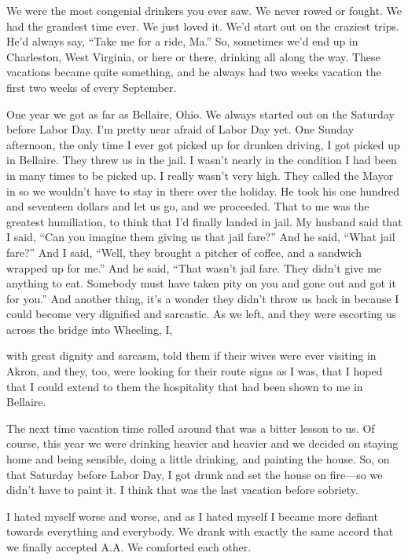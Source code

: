 \begin{biblechapter}
We were the most congenial drinkers you ever saw. We never rowed or fought. We had the grandest time ever. We just loved it. We’d start out on the craziest trips. He’d always say, “Take me for a ride, Ma.” So, sometimes we’d end up in Charleston, West Virginia, or here or there, drinking all along the way. These vacations became quite something, and he always had two weeks vacation the first two weeks of every September.

One year we got as far as Bellaire, Ohio. We always started out on the Saturday before Labor Day. I’m pretty near afraid of Labor Day yet. One Sunday afternoon, the only time I ever got picked up for drunken driving, I got picked up in Bellaire. They threw us in the jail. I wasn’t nearly in the condition I had been in many times to be picked up. I really wasn’t very high. They called the Mayor in so we wouldn’t have to stay in there over the holiday. He took his one hundred and seventeen dollars and let us go, and we proceeded. That to me was the greatest humiliation, to think that I’d finally landed in jail. My husband said that I said, “Can you imagine them giving us that jail fare?” And he said, “What jail fare?” And I said, “Well, they brought a pitcher of coffee, and a sandwich wrapped up for me.” And he said, “That wasn’t jail fare. They didn’t give me anything to eat. Somebody must have taken pity on you and gone out and got it for you.” And another thing, it’s a wonder they didn’t throw us back in because I could become very dignified and sarcastic. As we left, and they were escorting us across the bridge into Wheeling, I,

with great dignity and sarcasm, told them if their wives were ever visiting in Akron, and they, too, were looking for their route signs as I was, that I hoped that I could extend to them the hospitality that had been shown to me in Bellaire.

The next time vacation time rolled around that was a bitter lesson to us. Of course, this year we were drinking heavier and heavier and we decided on staying home and being sensible, doing a little drinking, and painting the house. So, on that Saturday before Labor Day, I got drunk and set the house on fire—so we didn’t have to paint it. I think that was the last vacation before sobriety.

I hated myself worse and worse, and as I hated myself I became more defiant towards everything and everybody. We drank with exactly the same accord that we finally accepted A.A. We comforted each other.


\end{biblechapter}
